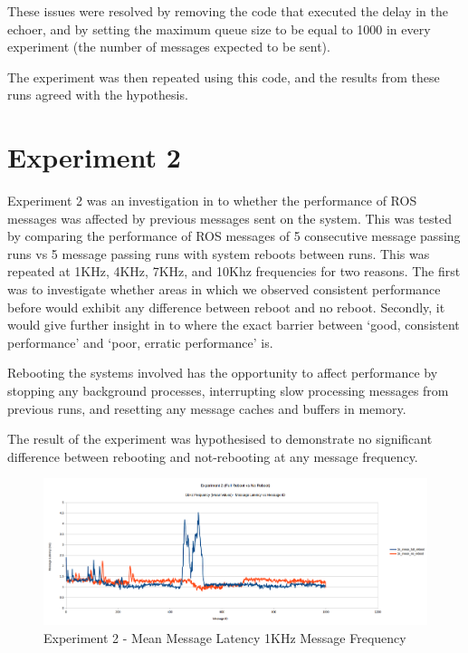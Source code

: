 \documentclass{l4proj}
\begin{document}
These issues were resolved by removing the code that executed the delay in the echoer, and by setting the maximum queue size to be equal to 1000 in every experiment (the number of messages expected to be sent).

The experiment was then repeated using this code, and the results from these runs agreed with the hypothesis.

\section{Experiment 2}

Experiment 2 was an investigation in to whether the performance of ROS messages was affected by previous messages sent on the system. This was tested by comparing the performance of ROS messages of 5 consecutive message passing runs vs 5 message passing runs with system reboots between runs. This was repeated at 1KHz, 4KHz, 7KHz, and 10Khz frequencies for two reasons. The first was to investigate whether areas in which we observed consistent performance before would exhibit any difference between reboot and no reboot. Secondly, it would give further insight in to where the exact barrier between `good, consistent performance' and `poor, erratic performance' is.

Rebooting the systems involved has the opportunity to affect performance by stopping any background processes, interrupting slow processing messages from previous runs, and resetting any message caches and buffers in memory.

The result of the experiment was hypothesised to demonstrate no significant difference between rebooting and not-rebooting at any message frequency.

\begin{figure}[h]
\centering
\includegraphics[width=\textwidth]{images/1khz-mean.png}
\caption{Experiment 2 - Mean Message Latency 1KHz Message Frequency}
\label{exp2-1khz-mean}
\end{figure}
\end{document}
